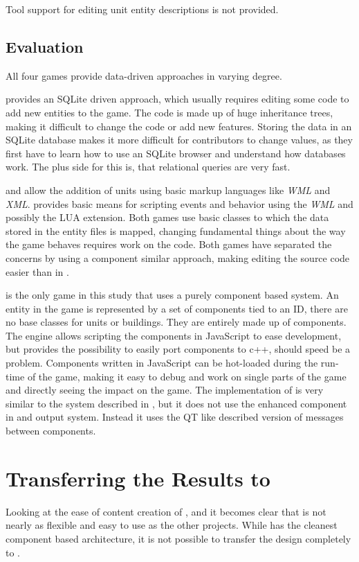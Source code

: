 Tool support for editing unit entity descriptions is not provided.

\subsection{Evaluation}
All four games provide data-driven approaches in varying degree.

\UH{} provides an SQLite driven approach, which usually requires editing some code to add new entities to the game. The
code is made up of huge inheritance trees, making it difficult to change the code or add new features. Storing the data
in an SQLite database makes it more difficult for contributors to change values, as they first have to learn how to use
an SQLite browser and understand how databases work. The plus side for this is, that relational queries are very fast.

\BOW{} and \GLEST{} allow the addition of units using basic markup languages like \textit{WML} and \textit{XML}. \BOW{}
provides basic means for scripting events and behavior using the \textit{WML} and possibly the LUA extension. Both
games use basic classes to which the data stored in the entity files is mapped, changing fundamental things about the
way the game behaves requires work on the code. Both games have separated the concerns by using a component similar
approach, making editing the source code easier than in \UH{}.

\AD{} is the only game in this study that uses a purely component based system. An entity in the game is represented by
a set of components tied to an ID, there are no base classes for units or buildings. They are entirely made up of
components. The engine allows scripting the components in JavaScript to ease development, but provides the possibility to
easily port components to c++, should speed be a problem. Components written in JavaScript can be hot-loaded during the run-time
of the game, making it easy to debug and work on single parts of the game and directly seeing the impact on the game.
The implementation of \AD{} is very similar to the system described in \cite{Fh02ageneric}, but it does not use the
enhanced component in and output system. Instead it uses the QT like described version of messages between components.

\section{Transferring the Results to \UH{}}
Looking at the ease of content creation of \BOW{}, \GLEST{} and \AD{} it becomes clear that \UH{} is not nearly as
flexible and easy to use as the other projects. While \AD{} has the cleanest component based architecture, it is not
possible to transfer the design completely to \UH{}. 

